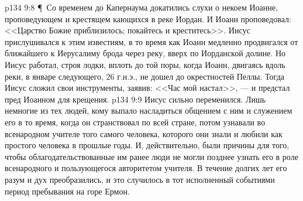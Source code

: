 \vs p134 9:8 \P\ Со временем до Капернаума докатились слухи о некоем Иоанне, проповедующем и крестящем кающихся в реке Иордан. И Иоанн проповедовал: <<Царство Божие приблизилось; покайтесь и креститесь>>. Иисус прислушивался к этим известиям, в то время как Иоанн медленно продвигался от ближайшего к Иерусалиму брода через реку, вверх по Иорданской долине. Но Иисус работал, строя лодки, вплоть до той поры, когда Иоанн, двигаясь вдоль реки, в январе следующего, 26 г.н.э., не дошел до окрестностей Пеллы. Тогда Иисус сложил свои инструменты, заявив: <<Час мой настал>>, --- и предстал пред Иоанном для крещения.
\vs p134 9:9 Иисус сильно переменился. Лишь немногие из тех людей, кому выпало насладиться общением с ним и служением его в то время, когда он странствовал по всей стране, потом узнавали во всенародном учителе того самого человека, которого они знали и любили как простого человека в прошлые годы. И, действительно, были причины для того, чтобы облагодательствованные им ранее люди не могли позднее узнать его в роле всенародного и пользующегося авторитетом учителя. В течение долгих лет его разум и дух преобразились, и это случилось в тот исполненный событиями период пребывания на горе Ермон.
